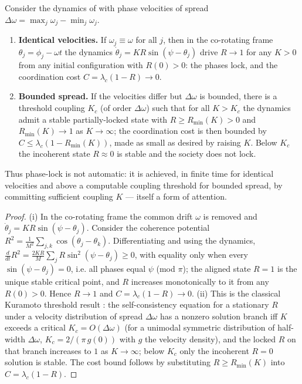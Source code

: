 \documentclass[11pt,twocolumn,a4paper]{article}
\newcommand{\Ord}{R}                 %
\newcommand{\phase}{\phi}
\begin{document}
\begin{theorem}
\label{thm:kuramoto-lock}
Consider the dynamics of  with phase velocities of
spread $\Delta\omega=\max_j\omega_j-\min_j\omega_j$.
\begin{enumerate}[label=\textup{(\roman*)},leftmargin=2.2em]
\item \textbf{Identical velocities.} If $\omega_j\equiv\omega$ for all $j$,
then in the co-rotating frame $\theta_j=\phase_j-\omega t$ the dynamics
$\dot\theta_j=K\Ord\sin(\psi-\theta_j)$ drive $\Ord\to1$ for any $K>0$ from
any initial configuration with $\Ord(0)>0$: the phases lock, and the
coordination cost $C=\lambda_c(1-\Ord)\to0$.
\item \textbf{Bounded spread.} If the velocities differ but
$\Delta\omega$ is bounded, there is a threshold coupling
$K_c$ (of order $\Delta\omega$) such that for all $K>K_c$ the dynamics admit
a stable partially-locked state with $\Ord\ge\Ord_{\min}(K)>0$ and
$\Ord_{\min}(K)\to1$ as $K\to\infty$; the coordination cost is then bounded
by $C\le\lambda_c(1-\Ord_{\min}(K))$, made as small as desired by raising
$K$. Below $K_c$ the incoherent state $\Ord\approx0$ is stable and the
society does not lock.
\end{enumerate}
Thus phase-lock is not automatic: it is achieved, in finite time for
identical velocities and above a computable coupling threshold for bounded
spread, by committing sufficient coupling $K$ --- itself a form of attention.
\end{theorem}

\begin{proof}
(i) In the co-rotating frame the common drift $\omega$ is removed and
$\dot\theta_j=K\Ord\sin(\psi-\theta_j)$. Consider the coherence potential
$\Ord^2=\frac1{M^2}\sum_{j,k}\cos(\theta_j-\theta_k)$. Differentiating and
using the dynamics,
$\frac{d}{dt}\Ord^2=\frac{2K\Ord}{M}\sum_j\Ord\sin^2(\psi-\theta_j)\ge0$,
with equality only when every $\sin(\psi-\theta_j)=0$, i.e. all phases equal
$\psi$ (mod $\pi$); the aligned state $\Ord=1$ is the unique stable
critical point, and $\Ord$ increases monotonically to it from any
$\Ord(0)>0$. Hence $\Ord\to1$ and $C=\lambda_c(1-\Ord)\to0$. (ii) This is
the classical Kuramoto threshold result \cite{strogatz2000,acebron2005}:
the self-consistency equation for a stationary $\Ord$ under a velocity
distribution of spread $\Delta\omega$ has a nonzero solution branch iff
$K$ exceeds a critical $K_c=O(\Delta\omega)$ (for a unimodal symmetric
distribution of half-width $\Delta\omega$, $K_c=2/(\pi \,g(0))$ with $g$ the
velocity density), and the locked $\Ord$ on that branch increases to $1$ as
$K\to\infty$; below $K_c$ only the incoherent $\Ord=0$ solution is stable.
The cost bound follows by substituting $\Ord\ge\Ord_{\min}(K)$ into
$C=\lambda_c(1-\Ord)$.
\end{proof}
\end{document}
